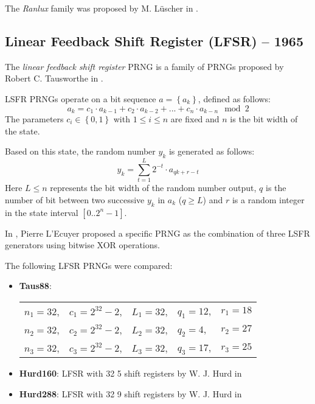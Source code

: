     The \textit{Ranlux} family was proposed by M. Lüscher in \cite{Luescher:1993}.

\subsection[Linear Feedback Shift Register (LFSR) -- 1965]{Linear Feedback Shift Register (LFSR) -- 1965} \label{subsec:lfsr}

    The \emph{linear feedback shift register} PRNG is a family of PRNGs proposed by Robert C. Tausworthe in \cite{Tausworthe:1965}.

    LSFR PRNGs operate on a bit sequence $a = \left\{a_k\right\}$, defined as follows:
    \begin{equation*}
        a_k = c_1 \cdot a_{k - 1} + c_2 \cdot a_{k - 2} + ... + c_n \cdot a_{k - n} \mod 2
    \end{equation*}
    The parameters $c_i \in \left\{0, 1\right\}$ with $1 \leq i \leq n$ are fixed and $n$ is the bit width of the state.

    Based on this state, the random number $y_k$ is generated as follows:
    \begin{equation*}
        y_k = \sum_{t = 1}^{L} 2^{-t} \cdot a_{qk + r - t}
    \end{equation*}
    Here $L \leq n$ represents the bit width of the random number output, $q$ is the number of bit between two successive $y_k$ in $a_k$ ($q \geq L$) and $r$ is a random integer in the state interval $\left[0 .. 2^n - 1\right]$.

    In \cite{LEcuyer:1996}, Pierre L'Ecuyer proposed a specific PRNG as the combination of three LSFR generators using bitwise XOR operations.

    The following LFSR PRNGs were compared:
    \begin{itemize}
        \itemsep0em
        \item \textbf{Taus88}:
            \begin{tabular}[t]{lllll}
                $n_1 = 32$, &$c_1 = 2^{32} - 2$, &$L_1 = 32$, &$q_1 = 12$, &$r_1 = 18$ \\
                $n_2 = 32$, &$c_2 = 2^{32} - 2$, &$L_2 = 32$, &$q_2 = 4$,  &$r_2 = 27$ \\
                $n_3 = 32$, &$c_3 = 2^{32} - 2$, &$L_3 = 32$, &$q_3 = 17$, &$r_3 = 25$
            \end{tabular}
        \item \textbf{Hurd160}: LFSR with 32 \SI{5}{\bit} shift registers by W. J. Hurd in \cite{Hurd:1974}
        \item \textbf{Hurd288}: LFSR with 32 \SI{9}{\bit} shift registers by W. J. Hurd in \cite{Hurd:1974}
    \end{itemize}

